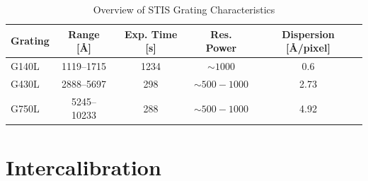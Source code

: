\begin{table}[h!]
	\centering
	\small
	\caption{Overview of STIS Grating Characteristics \parencite{stisgratings}}
	\label{tab:stis_gratings}
	\begin{tabular}{lcccc}
		\hline
		\textbf{Grating} & \textbf{Range [\AA]} & \textbf{Exp. Time [s]} & \textbf{Res. Power} & \textbf{Dispersion [\AA/pixel]} \\
		\hline
		G140L  & 1119--1715  & 1234 & $\sim 1000$         & 0.6 \\
		G430L  & 2888--5697  & 298  & $\sim 500 - 1000$    & 2.73 \\
		G750L  & 5245--10233 & 288  & $\sim 500 - 1000$    & 4.92 \\
		\hline
	\end{tabular}
\end{table}

\section{Intercalibration}
